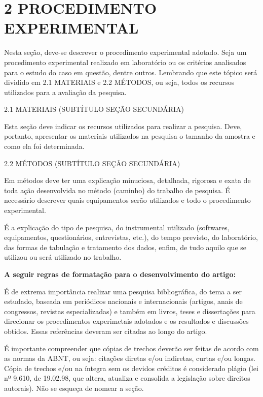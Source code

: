 \documentclass[
]{article}
\begin{document}
\section*{2 PROCEDIMENTO EXPERIMENTAL}\label{procedimento-experimental}

Nesta seção, deve-se descrever o procedimento experimental adotado. Seja
um procedimento experimental realizado em laboratório ou os critérios
analisados para o estudo do caso em questão, dentre outros. Lembrando
que este tópico será dividido em 2.1 MATERIAIS e 2.2 MÉTODOS, ou seja,
todos os recursos utilizados para a avaliação da pesquisa.

2.1 MATERIAIS (SUBTÍTULO SEÇÃO SECUNDÁRIA)

Esta seção deve indicar os recursos utilizados para realizar a pesquisa.
Deve, portanto, apresentar os materiais utilizados na pesquisa o tamanho
da amostra e como ela foi determinada.

2.2 MÉTODOS (SUBTÍTULO SEÇÃO SECUNDÁRIA)

Em métodos deve ter uma explicação minuciosa, detalhada, rigorosa e
exata de toda ação desenvolvida no método (caminho) do trabalho de
pesquisa. É necessário descrever quais equipamentos serão utilizados e
todo o procedimento experimental.

É a explicação do tipo de pesquisa, do instrumental utilizado
(softwares, equipamentos, questionários, entrevistas, etc.), do tempo
previsto, do laboratório, das formas de tabulação e tratamento dos
dados, enfim, de tudo aquilo que se utilizou ou será utilizado no
trabalho.

\textbf{A seguir regras de formatação para o desenvolvimento do artigo:}

É de extrema importância realizar uma pesquisa bibliográfica, do tema a
ser estudado, baseada em periódicos nacionais e internacionais (artigos,
anais de congressos, revistas especializadas) e também em livros, teses
e dissertações para direcionar os procedimentos experimetais adotados e
os resultados e discussões obtidos. Essas referências deveram ser
citadas ao longo do artigo.

É importante compreender que cópias de trechos deverão ser feitas de
acordo com as normas da ABNT, ou seja: citações diretas e/ou indiretas,
curtas e/ou longas. Cópia de trechos e/ou na íntegra sem os devidos
créditos é considerado plágio (lei nº 9.610, de 19.02.98, que altera,
atualiza e consolida a legislação sobre direitos autorais). Não se
esqueça de nomear a seção.
\end{document}
